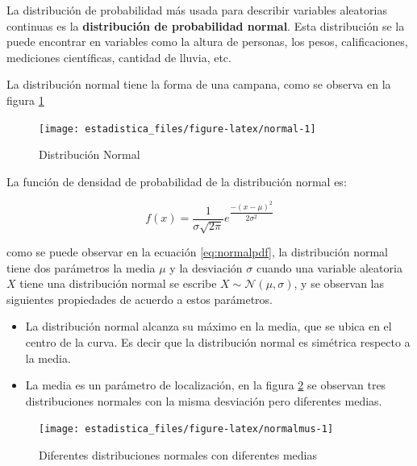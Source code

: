 \documentclass[]{book}
\providecommand{\tightlist}{%
  \setlength{\itemsep}{0pt}\setlength{\parskip}{0pt}}
\begin{document}
La distribución de probabilidad más usada para describir variables aleatorias continuas es la \textbf{distribución de probabilidad normal}. Esta distribución se la puede encontrar en variables como la altura de personas, los pesos, calificaciones, mediciones científicas, cantidad de lluvia, etc.

La distribución normal tiene la forma de una campana, como se observa en la figura \ref{fig:normal}

\begin{figure}[h!]

{\centering \texttt{[image: estadistica\_files/figure-latex/normal-1]} 

}

\caption{Distribución Normal}\label{fig:normal}
\end{figure}

La función de densidad de probabilidad de la distribución normal es:

\begin{equation} 
f\left(x\right)=\dfrac{1}{\sigma\sqrt{2\pi}}e^{\dfrac{-\left(x-\mu\right)^2}{2\sigma^2}}
\label{eq:normalpdf}
\end{equation}

como se puede observar en la ecuación \eqref{eq:normalpdf}, la distribución normal tiene dos parámetros la media \(\mu\) y la desviación \(\sigma\) cuando una variable aleatoria \(X\) tiene una distribución normal se escribe \(X \sim \mathcal{N}\left(\mu,\sigma \right)\), y se observan las siguientes propiedades de acuerdo a estos parámetros.

\begin{itemize}
\tightlist
\item
  La distribución normal alcanza su máximo en la media, que se ubica en el centro de la curva. Es decir que la distribución normal es simétrica respecto a la media.
\item
  La media es un parámetro de localización, en la figura \ref{fig:normalmus} se observan tres distribuciones normales con la misma desviación pero diferentes medias.
\end{itemize}

\begin{figure}[h!]

{\centering \texttt{[image: estadistica\_files/figure-latex/normalmus-1]} 

}

\caption{Diferentes distribuciones normales con diferentes medias}\label{fig:normalmus}
\end{figure}
\end{document}
